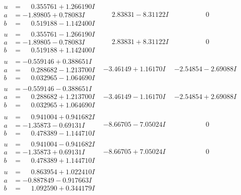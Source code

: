 \documentclass[1p]{elsarticle_modified}
\theoremstyle{definition}
\begin{document}
$$\begin{array}{c|c|c}
\begin{aligned}
u &= \phantom{-}0.355761 + 1.266190 I \\
a &= -1.89805 + 0.78083 I \\
b &= \phantom{-}0.519188 - 1.142400 I\end{aligned}
 & \phantom{-}2.83831 - 8.31122 I & \phantom{-0.000000 } 0 \\ \hline\begin{aligned}
u &= \phantom{-}0.355761 - 1.266190 I \\
a &= -1.89805 - 0.78083 I \\
b &= \phantom{-}0.519188 + 1.142400 I\end{aligned}
 & \phantom{-}2.83831 + 8.31122 I & \phantom{-0.000000 } 0 \\ \hline\begin{aligned}
u &= -0.559146 + 0.388651 I \\
a &= \phantom{-}0.288682 - 1.213700 I \\
b &= \phantom{-}0.032965 - 1.064690 I\end{aligned}
 & -3.46149 + 1.16170 I & -2.54854 - 2.69088 I \\ \hline\begin{aligned}
u &= -0.559146 - 0.388651 I \\
a &= \phantom{-}0.288682 + 1.213700 I \\
b &= \phantom{-}0.032965 + 1.064690 I\end{aligned}
 & -3.46149 - 1.16170 I & -2.54854 + 2.69088 I \\ \hline\begin{aligned}
u &= \phantom{-}0.941004 + 0.941682 I \\
a &= -1.35873 - 0.69131 I \\
b &= \phantom{-}0.478389 - 1.144710 I\end{aligned}
 & -8.66705 - 7.05024 I & \phantom{-0.000000 } 0 \\ \hline\begin{aligned}
u &= \phantom{-}0.941004 - 0.941682 I \\
a &= -1.35873 + 0.69131 I \\
b &= \phantom{-}0.478389 + 1.144710 I\end{aligned}
 & -8.66705 + 7.05024 I & \phantom{-0.000000 } 0 \\ \hline\begin{aligned}
u &= \phantom{-}0.863954 + 1.022410 I \\
a &= -0.887849 - 0.917663 I \\
b &= \phantom{-}1.092590 + 0.344179 I\end{aligned}

\end{array}$$
\end{document}
